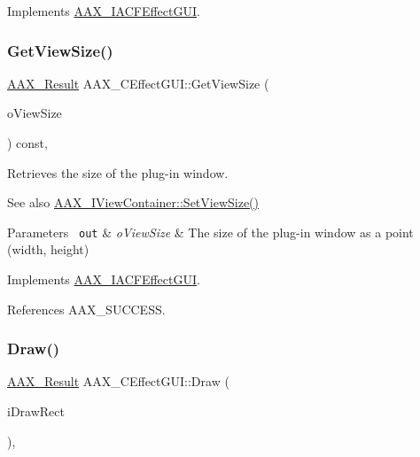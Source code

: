 Implements \mbox{\hyperlink{a01665_a50830385c58f104c87b6ef25144b30dd}{A\+A\+X\+\_\+\+I\+A\+C\+F\+Effect\+G\+UI}}.

\mbox{\label{a01477_a23c51648957128cf563b31e1a5fbc249}} 
\subsubsection{\texorpdfstring{GetViewSize()}{GetViewSize()}}
{\footnotesize\ttfamily \mbox{\hyperlink{a00392_a4d8f69a697df7f70c3a8e9b8ee130d2f}{A\+A\+X\+\_\+\+Result}} A\+A\+X\+\_\+\+C\+Effect\+G\+U\+I\+::\+Get\+View\+Size (\begin{DoxyParamCaption}\item[{\mbox{\hyperlink{a01609}{A\+A\+X\+\_\+\+Point}} $\ast$}]{o\+View\+Size }\end{DoxyParamCaption}) const\hspace{0.3cm}{\ttfamily [inline]}, {\ttfamily [virtual]}}



Retrieves the size of the plug-\/in window. 

\begin{DoxySeeAlso}{See also}
\mbox{\hyperlink{a01889_ad750e9f0231c61ab32114276ee8cb5f7}{A\+A\+X\+\_\+\+I\+View\+Container\+::\+Set\+View\+Size()}}
\end{DoxySeeAlso}

\begin{DoxyParams}[1]{Parameters}
\mbox{\texttt{ out}}  & {\em o\+View\+Size} & The size of the plug-\/in window as a point (width, height) \\
\hline
\end{DoxyParams}


Implements \mbox{\hyperlink{a01665_ae67c876225e9b5c538560d19a842a34c}{A\+A\+X\+\_\+\+I\+A\+C\+F\+Effect\+G\+UI}}.



References A\+A\+X\+\_\+\+S\+U\+C\+C\+E\+SS.

\mbox{\label{a01477_a7a6e6ffea34c7c85f6e3d00bb6e564e0}} 
\subsubsection{\texorpdfstring{Draw()}{Draw()}}
{\footnotesize\ttfamily \mbox{\hyperlink{a00392_a4d8f69a697df7f70c3a8e9b8ee130d2f}{A\+A\+X\+\_\+\+Result}} A\+A\+X\+\_\+\+C\+Effect\+G\+U\+I\+::\+Draw (\begin{DoxyParamCaption}\item[{\mbox{\hyperlink{a01613}{A\+A\+X\+\_\+\+Rect}} $\ast$}]{i\+Draw\+Rect }\end{DoxyParamCaption})\hspace{0.3cm}{\ttfamily [inline]}, {\ttfamily [virtual]}}



